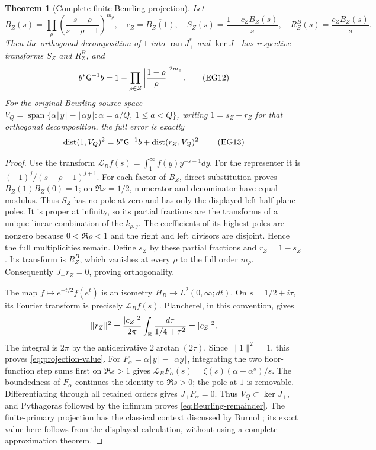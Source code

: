 \documentclass[11pt]{article}
\newtheorem{theorem}{Theorem}[section]
\begin{document}
\begin{theorem}[Complete finite Beurling projection]\label{thm:projection}
Let
\[
 B_Z(s)=\prod_\rho\left(\frac{s-\rho}{s+\bar\rho-1}\right)^{m_\rho},
 \quad c_Z=\overline{B_Z(1)},\quad
 S_Z(s)=\frac{1-c_ZB_Z(s)}s,\quad R_Z^B(s)=\frac{c_ZB_Z(s)}s.
 \tag{EG11}\label{eq:Blaschke}
\]
Then the orthogonal decomposition of $1$ into $\operatorname{ran}J_+^*$
and $\ker J_+$ has respective transforms $S_Z$ and $R_Z^B$, and
\[
 b^*\mathsf G^{-1}b=1-\prod_{\rho\in Z}
                   \left|\frac{1-\rho}{\rho}\right|^{2m_\rho}.
 \tag{EG12}\label{eq:projection-value}
\]
For the original Beurling source space
$V_Q=\operatorname{span}\{\alpha\lfloor y\rfloor-\lfloor\alpha y\rfloor:
\alpha=a/Q,\ 1\le a<Q\}$, writing $1=s_Z+r_Z$ for that orthogonal
decomposition, the full error is exactly
\[
 \operatorname{dist}(1,V_Q)^2=b^*\mathsf G^{-1}b+
                                      \operatorname{dist}(r_Z,V_Q)^2.
 \tag{EG13}\label{eq:Beurling-remainder}
\]
\end{theorem}
\begin{proof}
Use the transform $\mathcal L_Bf(s)=\int_1^\infty f(y)y^{-s-1}dy$.
For the representer it is $(-1)^j/(s+\bar\rho-1)^{j+1}$.
For each factor of $B_Z$, direct substitution proves
$\overline{B_Z(1)}B_Z(0)=1$; on $\Re s=1/2$, numerator and
denominator have equal modulus. Thus $S_Z$ has no pole at zero and
has only the displayed left-half-plane poles. It is proper at
infinity, so its partial fractions are the transforms of a unique
linear combination of the $k_{\rho,j}$. The coefficients of its
highest poles are nonzero because $0<\Re\rho<1$ and the right and
left divisors are disjoint. Hence the full multiplicities remain.
Define $s_Z$ by these partial fractions and $r_Z=1-s_Z$. Its
transform is $R_Z^B$, which vanishes at every $\rho$ to the full
order $m_\rho$. Consequently $J_+r_Z=0$, proving orthogonality.

The map $f\mapsto e^{-t/2}f(e^t)$ is an isometry
$H_B\to L^2(0,\infty;dt)$. On $s=1/2+i\tau$, its Fourier transform
is precisely $\mathcal L_Bf(s)$. Plancherel, in this convention,
gives
\[
 \|r_Z\|^2=\frac{|c_Z|^2}{2\pi}
                  \int_\mathbb R\frac{d\tau}{1/4+\tau^2}=|c_Z|^2.
\]
The integral is $2\pi$ by the antiderivative $2\arctan(2\tau)$.
Since $\|1\|^2=1$, this proves \eqref{eq:projection-value}.
For $F_\alpha=\alpha\lfloor y\rfloor-\lfloor\alpha y\rfloor$,
integrating the two floor-function step sums first on $\Re s>1$
gives $\mathcal L_BF_\alpha(s)=\zeta(s)(\alpha-\alpha^s)/s$.
The boundedness of $F_\alpha$ continues the identity to $\Re s>0$;
the pole at $1$ is removable. Differentiating through all retained
orders gives $J_+F_\alpha=0$. Thus $V_Q\subset\ker J_+$, and
Pythagoras followed by the infimum proves \eqref{eq:Beurling-remainder}.
The finite-primary projection has the classical context discussed
by Burnol \cite{Burnol}; its exact value here follows from the
displayed calculation, without using a complete approximation theorem.
\end{proof}
\end{document}
